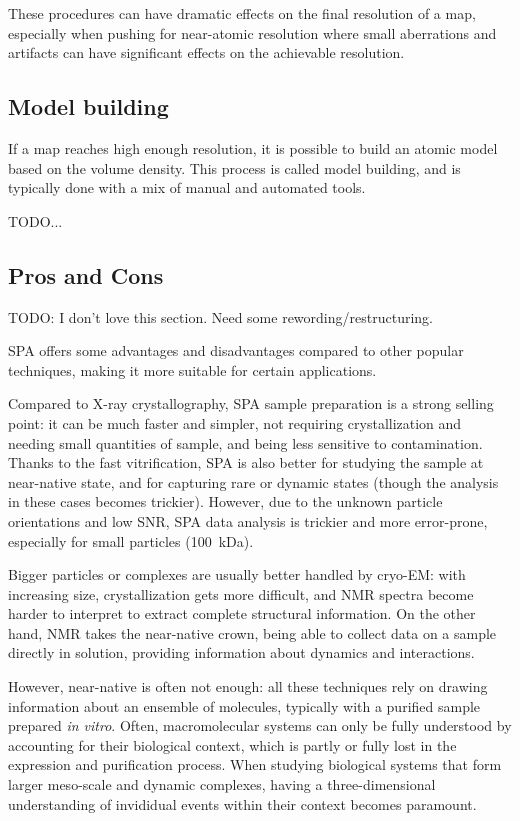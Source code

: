 These procedures can have dramatic effects on the final resolution of a map, especially when pushing for near-atomic resolution where small aberrations and artifacts can have significant effects on the achievable resolution.

\subsection{Model building}

If a map reaches high enough resolution, it is possible to build an atomic model based on the volume density.
This process is called model building, and is typically done with a mix of manual and automated tools.

TODO...

\subsection{Pros and Cons}

TODO: I don't love this section. Need some rewording/restructuring.

SPA offers some advantages and disadvantages compared to other popular techniques, making it more suitable for certain applications.

Compared to X-ray crystallography, SPA sample preparation is a strong selling point: it can be much faster and simpler, not requiring crystallization and needing small quantities of sample, and being less sensitive to contamination.
Thanks to the fast vitrification, SPA is also better for studying the sample at near-native state, and for capturing rare or dynamic states (though the analysis in these cases becomes trickier).
However, due to the unknown particle orientations and low SNR, SPA data analysis is trickier and more error-prone, especially for small particles (\lesssim\qty{100}{\kilo\dalton}).

Bigger particles or complexes are usually better handled by cryo-EM: with increasing size, crystallization gets more difficult, and NMR spectra become harder to interpret to extract complete structural information.
On the other hand, NMR takes the near-native crown, being able to collect data on a sample directly in solution, providing information about dynamics and interactions.

However, near-native is often not enough: all these techniques rely on drawing information about an ensemble of molecules, typically with a purified sample prepared \textit{in vitro}.
Often, macromolecular systems can only be fully understood by accounting for their biological context, which is partly or fully lost in the expression and purification process.
When studying biological systems that form larger meso-scale and dynamic complexes, having a three-dimensional understanding of invididual events within their context becomes paramount.

